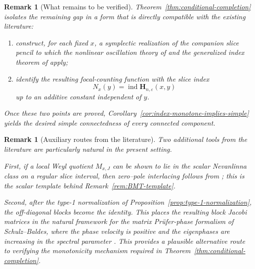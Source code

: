 \documentclass[11pt]{article}
\newtheorem{remark}[theorem]{Remark}
\DeclareMathOperator{\ind}{ind}
\begin{document}
\begin{remark}[What remains to be verified]\label{rem:remaining-gap}
Theorem~\ref{thm:conditional-completion} isolates the remaining gap in a form that is directly
compatible with the existing literature:

\begin{enumerate}
\item construct, for each fixed \(x\), a symplectic realization of the companion slice pencil to
which the nonlinear oscillation theory of \cite{Hilscher2012} and the generalized index theorem
of \cite{KratzHilscher2013} apply;

\item identify the resulting focal-counting function with the slice index
\[
N_x(y)=\ind \mathbf H_{n,\varepsilon}(x,y)
\]
up to an additive constant independent of \(y\).
\end{enumerate}

Once these two points are proved, Corollary~\ref{cor:index-monotone-implies-simple} yields the
desired simple connectedness of every connected component.
\end{remark}

\begin{remark}[Auxiliary routes from the literature]\label{rem:auxiliary-routes}
Two additional tools from the literature are particularly natural in the present setting.

First, if a local Weyl quotient \(M_{x,J}\) can be shown to lie in the scalar Nevanlinna class on
a regular slice interval, then zero--pole interlacing follows from
\cite[Corollary~3.5]{BehrndtMowsTrunk2011}; this is the scalar template behind
Remark~\ref{rem:BMT-template}.

Second, after the type-1 normalization of Proposition~\ref{prop:type-1-normalization}, the
off-diagonal blocks become the identity. This places the resulting block Jacobi matrices in the
natural framework for the matrix Prüfer-phase formalism of Schulz--Baldes, where the phase
velocity is positive and the eigenphases are increasing in the spectral parameter
\cite[Theorem~1(v) and Proposition~6]{SchulzBaldes2007}. This provides a plausible alternative
route to verifying the monotonicity mechanism required in
Theorem~\ref{thm:conditional-completion}.
\end{remark}
\end{document}
